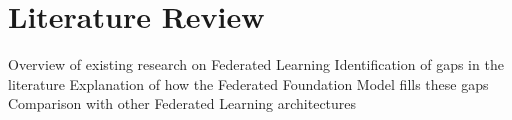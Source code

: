 \section{Literature Review}
Overview of existing research on Federated Learning
Identification of gaps in the literature
Explanation of how the Federated Foundation Model fills these gaps
Comparison with other Federated Learning architectures